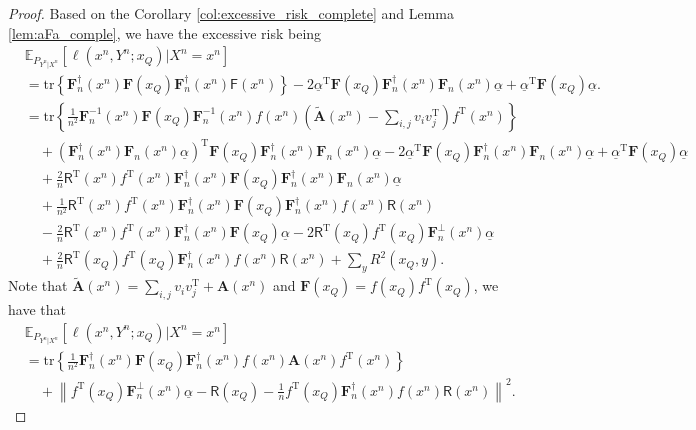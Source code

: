 \documentclass{article} %
\theoremstyle{plain} %
\begin{document}
\begin{proof}
    Based on the Corollary \ref{col:excessive_risk_complete} and Lemma \ref{lem:aFa_comple}, we have the excessive risk being
\begin{align*}
& \mathbb{E}_{P_{Y^n|X^n}}\left[ 
\ell \left(x^n,Y^n;x_Q\right) | X^n = x^n\right]\\
&= \mathrm{tr}\left\{ \mathbf{F}_n^{\dagger}(x^n)\mathbf{F}(x_Q)\mathbf{F}_n^{\dagger}(x^n) \mathsf{F}(x^n) \right\} - 2\underline{\alpha}^\mathrm{T}\mathbf{F}(x_Q)\mathbf{F}_n^{\dagger}(x^n)\mathbf{F}_n(x^n)\underline{\alpha} + \underline{\alpha}^{\mathrm{T}} \mathbf{F}(x_Q)\underline{\alpha}.\\
& = \mathrm{tr}\left\{ \frac1{n^2}\mathbf{F}_n^{-1}(x^n)\mathbf{F}(x_Q)\mathbf{F}_n^{-1}(x^n) f(x^n) \left(\tilde{\mathbf{A}}(x^n) - \sum_{i,j}v_iv_j^\mathrm{T}\right)f^\mathrm{T}(x^n) \right\}\\
& \quad + \left(\mathbf{F}_n^{\dagger}(x^n)\mathbf{F}_n(x^n)\underline{\alpha}\right)^\mathrm{T}\mathbf{F}(x_Q)\mathbf{F}_n^{\dagger}(x^n)\mathbf{F}_n(x^n)\underline{\alpha} - 2\underline{\alpha}^\mathrm{T}\mathbf{F}(x_Q)\mathbf{F}_n^{\dagger}(x^n)\mathbf{F}_n(x^n)\underline{\alpha} + \underline{\alpha}^{\mathrm{T}} \mathbf{F}(x_Q)\underline{\alpha}\\
& \quad + \frac2n \mathsf{R}^\mathrm{T}(x^n)f^\mathrm{T}(x^n)\mathbf{F}_n^{\dagger}(x^n) \mathbf{F}(x_Q)\mathbf{F}_n^{\dagger}(x^n) \mathbf{F}_n(x^n)\underline{\alpha}\\
& \quad + \frac1{n^2}  \mathsf{R}^\mathrm{T}(x^n)f^\mathrm{T}(x^n)\mathbf{F}_n^{\dagger}(x^n) \mathbf{F}(x_Q)\mathbf{F}_n^{\dagger}(x^n) f(x^n) \mathsf{R}(x^n)\\
& \quad - \frac2n \mathsf{R}^\mathrm{T}(x^n)f^\mathrm{T}(x^n)\mathbf{F}_n^{\dagger}(x^n)\mathbf{F}(x_Q)\underline{\alpha} - 2 \mathsf{R}^\mathrm{T}(x_Q)f^\mathrm{T}(x_Q)\mathbf{F}_n^\perp(x^n)\underline{\alpha}\\  
& \quad + \frac2n \mathsf{R}^\mathrm{T}(x_Q)f^\mathrm{T}(x_Q)\mathbf{F}_n^{\dagger}(x^n)f(x^n)\mathsf{R}(x^n) + \sum_y R^2(x_Q,y).
\end{align*}
Note that $\tilde{\mathbf{A}}(x^n) = \sum_{i,j}v_iv_j^\mathrm{T} + \mathbf{A}(x^n)$ and $\mathbf{F}(x_Q) = f(x_Q)f^\mathrm{T}(x_Q)$, we have that
\begin{align*}
& \mathbb{E}_{P_{Y^n|X^n}}\left[ 
\ell \left(x^n,Y^n;x_Q\right) | X^n = x^n\right]\\
& = \mathrm{tr}\left\{ \frac1{n^2}\mathbf{F}_n^{\dagger}(x^n)\mathbf{F}(x_Q)\mathbf{F}_n^{\dagger}(x^n) f(x^n) {\mathbf{A}}(x^n) f^\mathrm{T}(x^n) \right\}\\
& \quad +
\left\| f ^{\mathrm{T}}(x_Q)\mathbf{F}_n^\perp(x^n)\underline{\alpha} - \mathsf{R}(x_Q) - \frac1n f^\mathrm{T}(x_Q)\mathbf{F}_n^{\dagger}(x^n)f(x^n)\mathsf{R}(x^n)\right\|^2.
\end{align*}
\end{proof}
\end{document}
